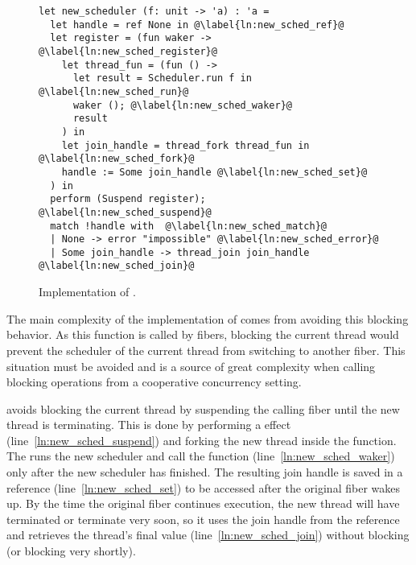 \begin{figure}[ht]
  \begin{verbatim}
let new_scheduler (f: unit -> 'a) : 'a = 
  let handle = ref None in @\label{ln:new_sched_ref}@
  let register = (fun waker -> @\label{ln:new_sched_register}@ 
    let thread_fun = (fun () ->
      let result = Scheduler.run f in @\label{ln:new_sched_run}@ 
      waker (); @\label{ln:new_sched_waker}@
      result
    ) in
    let join_handle = thread_fork thread_fun in @\label{ln:new_sched_fork}@
    handle := Some join_handle @\label{ln:new_sched_set}@
  ) in
  perform (Suspend register); @\label{ln:new_sched_suspend}@
  match !handle with  @\label{ln:new_sched_match}@
  | None -> error "impossible" @\label{ln:new_sched_error}@
  | Some join_handle -> thread_join join_handle @\label{ln:new_sched_join}@
\end{verbatim}
  \caption{Implementation of .}
  \label{fig:dm-impl}
\end{figure}

The main complexity of the implementation of  comes from avoiding this blocking behavior.
As this function is called by fibers, blocking the current thread would prevent the scheduler of the current thread from switching to another fiber.
This situation must be avoided and is a source of great complexity when calling blocking operations from a cooperative concurrency setting.

 avoids blocking the current thread by suspending the calling fiber until the new thread is terminating.
This is done by performing a \esuspend{} effect (line~\ref{ln:new_sched_suspend}) and forking the new thread inside the  function.
The  runs the new scheduler and call the  function (line~\ref{ln:new_sched_waker}) only after the new scheduler has finished.
The resulting join handle is saved in a reference (line~\ref{ln:new_sched_set}) to be accessed after the original fiber wakes up.
By the time the original fiber continues execution, the new thread will have terminated or terminate very soon, so it uses the join handle from the reference and retrieves the thread's final value (line~\ref{ln:new_sched_join}) without blocking (or blocking very shortly).

